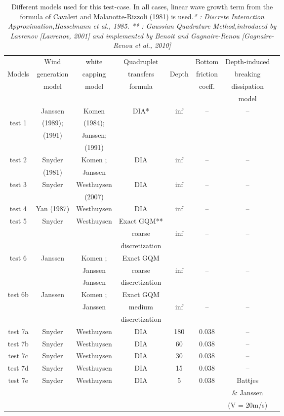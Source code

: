 \begin{table}
\begin{tabular}{|c|c|c|c|c|c|c|c|}
\hline
       & Wind        & white     & Quadruplet &         & Bottom  & Depth-induced  \\
Models & generation  &  capping  & transfers  &  Depth &  friction & breaking \\
       &  model      &  model    &   formula &         &  coeff. &  dissipation \\
       &        &      &    &         &   &   model\\\hline
  & Janssen & Komen& DIA* & $\inf$ & -- & --\\
test 1 & (1989); &(1984);& &  &  &\\
 &  (1991) & Janssen;  & &  &  & \\
&   &  (1991)  & &  &  & \\
\hline
test 2  & Snyder  & Komen ;  & DIA & $\inf$ & --& --\\
 &  (1981)& Janssen & &  & &\\
\hline
test 3 & Snyder & Westhuysen  & DIA & $\inf$ & --& -- \\
 &  &  (2007) &  & & &  \\
\hline
test 4 & Yan (1987) & Westhuysen & DIA & $\inf$ & --& -- \\
\hline
test 5 & Snyder & Westhuysen & Exact GQM** & & &  \\
 &  &  &  coarse  & $\inf$ & --& --\\
 &  &  &  discretization & & & \\ \hline
 test 6 & Janssen &Komen ;  & Exact GQM  & & &\\
 &  & Janssen  &  coarse & $\inf$ & -- & -- \\
 &  & Janssen  &  discretization & & & \\ \hline
 test 6b & Janssen & Komen ;& Exact GQM &  & & \\
  &  & Janssen   &  medium  &$\inf$ & -- & --\\
  &  &    &  discretization & & & \\ \hline
test 7a & Snyder & Westhuysen & DIA & 180 & 0.038 & -- \\
 test 7b & Snyder & Westhuysen & DIA & 60 & 0.038& -- \\
 test 7c & Snyder & Westhuysen & DIA & 30 & 0.038& -- \\
  test 7d & Snyder & Westhuysen& DIA & 15 & 0.038& -- \\
   test 7e & Snyder & Westhuysen& DIA & 5 & 0.038& Battjes  \\
    &  & &  & & &\& Janssen \\
    &  & &  & & &(V = 20m/s) \\ \hline
 \end{tabular}
 \caption{Different models used for this test-case. In all cases, linear wave growth term from the formula of Cavaleri and
Malanotte-Rizzoli (1981) is used.\textit{* : Discrete Interaction Approximation,Hasselmann et al., 1985. ** : Gaussian Quadrature Method,introduced by Lavrenov
[Lavrenov, 2001] and implemented by Benoit and Gagnaire-Renou [Gagnaire-Renou et al., 2010]}}
\label{tabmodel}
\end{table}
